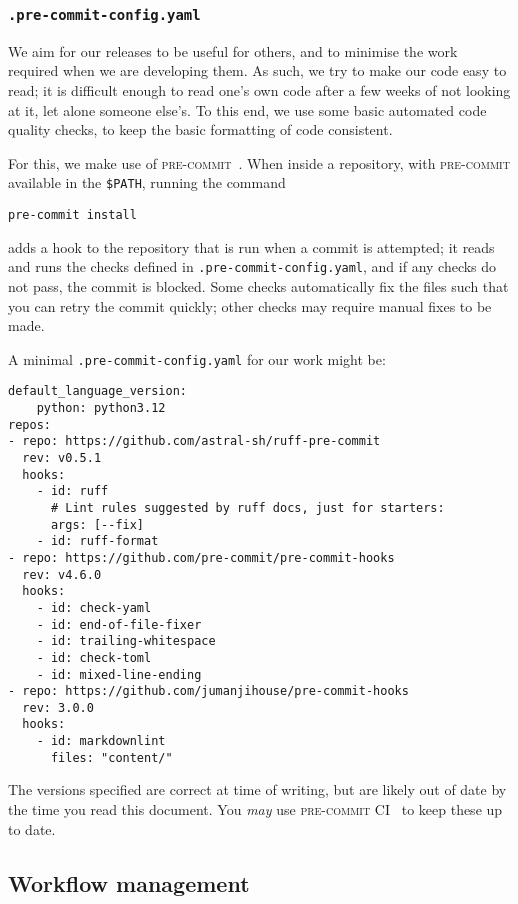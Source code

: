 \documentclass{article}
\newcommand\rfcword[1]{\emph{#1}\xspace}
\newcommand\may{\rfcword{may}}
\newcommand\filename[1]{\texttt{#1}\xspace}
\newcommand\program[1]{\textsc{#1}\xspace}
\begin{document}
\subsubsection{\filename{.pre-commit-config.yaml}}

We aim for our releases to be useful for others,
and to minimise the work required when we are developing them.
As such,
we try to make our code easy to read;
it is difficult enough to read one's own code
after a few weeks of not looking at it,
let alone someone else's.
To this end,
we use some basic automated code quality checks,
to keep the basic formatting of code consistent.

For this,
we make use of \program{pre-commit}~\cite{pre-commit}.
When inside a repository,
with \program{pre-commit} available in the \texttt{\$PATH},
running the command
\begin{verbatim}
pre-commit install
\end{verbatim}
adds a hook to the repository that is run when a commit is attempted;
it reads and runs the checks defined in \filename{.pre-commit-config.yaml},
and if any checks do not pass,
the commit is blocked.
Some checks automatically fix the files such that you can retry the commit quickly;
other checks may require manual fixes to be made.

A minimal \filename{.pre-commit-config.yaml} for our work might be:

\begin{verbatim}
default_language_version:
    python: python3.12
repos:
- repo: https://github.com/astral-sh/ruff-pre-commit
  rev: v0.5.1
  hooks:
    - id: ruff
      # Lint rules suggested by ruff docs, just for starters:
      args: [--fix]
    - id: ruff-format
- repo: https://github.com/pre-commit/pre-commit-hooks
  rev: v4.6.0
  hooks:
    - id: check-yaml
    - id: end-of-file-fixer
    - id: trailing-whitespace
    - id: check-toml
    - id: mixed-line-ending
- repo: https://github.com/jumanjihouse/pre-commit-hooks
  rev: 3.0.0
  hooks:
    - id: markdownlint
      files: "content/"
\end{verbatim}

The versions specified are correct at time of writing,
but are likely out of date by the time you read this document.
You \may use \program{pre-commit CI}~\cite{pre-commit-ci} to keep these up to date.

\subsection{Workflow management}
\end{document}
